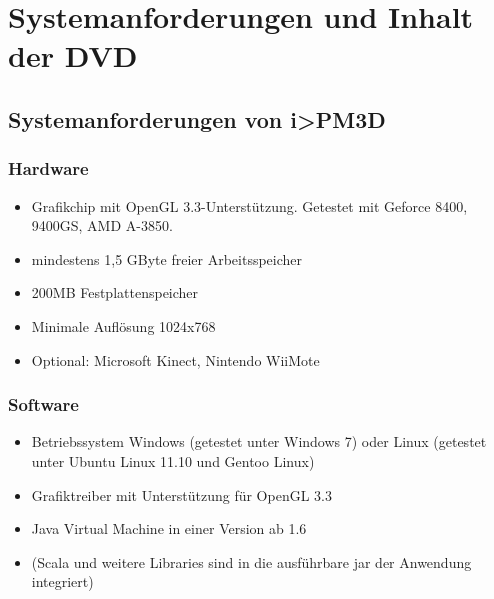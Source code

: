 \documentclass[a4paper,10pt]{sphinxmanual}
\begin{document}
\chapter{Systemanforderungen und Inhalt der DVD}
\label{anhang_b:anhang-dvd}\label{anhang_b:systemanforderungen-und-inhalt-der-dvd}\label{anhang_b::doc}

\section{Systemanforderungen von i\textgreater{}PM3D}
\label{anhang_b:systemanforderungen-von-i-pm3d}

\subsection{Hardware}
\label{anhang_b:hardware}\begin{itemize}
\item {} 
Grafikchip mit OpenGL 3.3-Unterstützung. Getestet mit Geforce 8400, 9400GS, AMD A-3850.

\item {} 
mindestens 1,5 GByte freier Arbeitsspeicher

\item {} 
200MB Festplattenspeicher

\item {} 
Minimale Auflösung 1024x768

\item {} 
Optional: Microsoft Kinect, Nintendo WiiMote

\end{itemize}


\subsection{Software}
\label{anhang_b:software}\begin{itemize}
\item {} 
Betriebssystem Windows (getestet unter Windows 7) oder Linux (getestet unter Ubuntu Linux 11.10 und Gentoo Linux)

\item {} 
Grafiktreiber mit Unterstützung für OpenGL 3.3

\item {} 
Java Virtual Machine in einer Version ab 1.6

\item {} 
(Scala und weitere Libraries sind in die ausführbare jar der Anwendung integriert)

\end{itemize}
\end{document}
